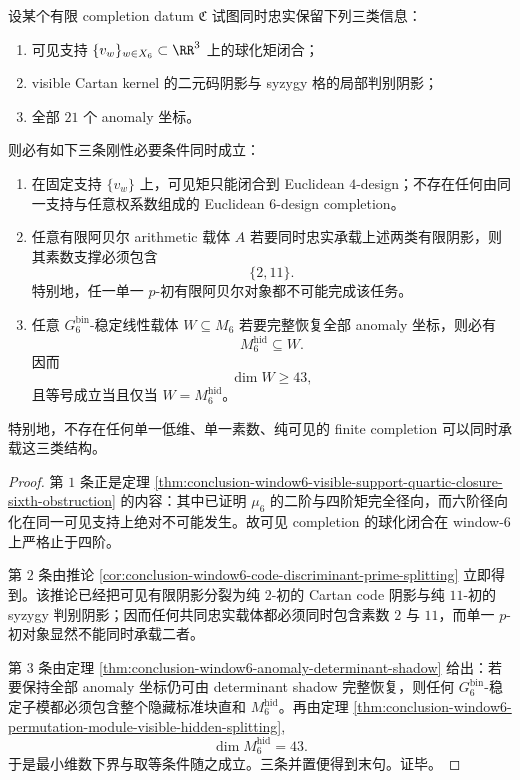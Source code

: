 \begin{theorem}\label{thm:conclusion-window6-completion-threefold-incompressibility}
设某个有限 completion datum \(\mathfrak C\) 试图同时忠实保留下列三类信息：
\begin{enumerate}
  \item 可见支持 \(\{v_w\}_{w\in X_6}\subset \RR^3\) 上的球化矩闭合；
  \item visible Cartan kernel 的二元码阴影与 syzygy 格的局部判别阴影；
  \item 全部 \(21\) 个 anomaly 坐标。
\end{enumerate}
则必有如下三条刚性必要条件同时成立：
\begin{enumerate}
  \item 在固定支持 \(\{v_w\}\) 上，可见矩只能闭合到 Euclidean \(4\)-design；不存在任何由同一支持与任意权系数组成的 Euclidean \(6\)-design completion。
  \item 任意有限阿贝尔 arithmetic 载体 \(A\) 若要同时忠实承载上述两类有限阴影，则其素数支撑必须包含
  \[
  \{2,11\}.
  \]
  特别地，任一单一 \(p\)-初有限阿贝尔对象都不可能完成该任务。
  \item 任意 \(G_6^{\mathrm{bin}}\)-稳定线性载体 \(W\subseteq M_6\) 若要完整恢复全部 anomaly 坐标，则必有
  \[
  M_6^{\mathrm{hid}}\subseteq W.
  \]
  因而
  \[
  \dim W\ge 43,
  \]
  且等号成立当且仅当 \(W=M_6^{\mathrm{hid}}\)。
\end{enumerate}
特别地，不存在任何单一低维、单一素数、纯可见的 finite completion 可以同时承载这三类结构。
\end{theorem}
\begin{proof}
第 \(1\) 条正是定理 \ref{thm:conclusion-window6-visible-support-quartic-closure-sixth-obstruction} 的内容：其中已证明 \(\mu_6\) 的二阶与四阶矩完全径向，而六阶径向化在同一可见支持上绝对不可能发生。故可见 completion 的球化闭合在 window-\(6\) 上严格止于四阶。

第 \(2\) 条由推论 \ref{cor:conclusion-window6-code-discriminant-prime-splitting} 立即得到。该推论已经把可见有限阴影分裂为纯 \(2\)-初的 Cartan code 阴影与纯 \(11\)-初的 syzygy 判别阴影；因而任何共同忠实载体都必须同时包含素数 \(2\) 与 \(11\)，而单一 \(p\)-初对象显然不能同时承载二者。

第 \(3\) 条由定理 \ref{thm:conclusion-window6-anomaly-determinant-shadow} 给出：若要保持全部 anomaly 坐标仍可由 determinant shadow 完整恢复，则任何 \(G_6^{\mathrm{bin}}\)-稳定子模都必须包含整个隐藏标准块直和 \(M_6^{\mathrm{hid}}\)。再由定理 \ref{thm:conclusion-window6-permutation-module-visible-hidden-splitting},
\[
\dim M_6^{\mathrm{hid}}=43.
\]
于是最小维数下界与取等条件随之成立。三条并置便得到末句。证毕。
\end{proof}

